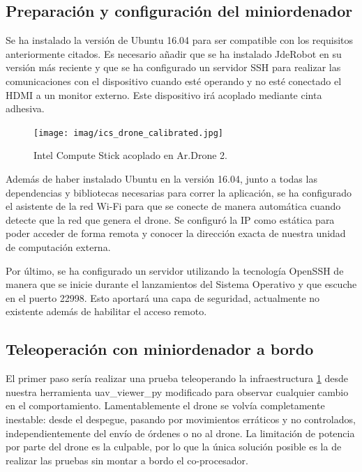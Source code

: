 \subsection{Preparación y configuración del miniordenador}

Se ha instalado la versión de Ubuntu 16.04 para ser compatible con los requisitos anteriormente citados. Es necesario añadir que se ha instalado JdeRobot en su versión más reciente y que se ha configurado un servidor SSH para realizar las comunicaciones con el dispositivo cuando esté operando y no esté conectado el HDMI a un monitor externo. Este dispositivo irá acoplado mediante cinta adhesiva.

\begin{figure}[H]
	\begin{center}
		\texttt{[image: imag/ics\_drone\_calibrated.jpg]}
		\caption{Intel Compute Stick acoplado en Ar.Drone 2.}
		\label{fig:intelAcoplado}	
	\end{center}
\end{figure}

Además de haber instalado Ubuntu en la versión 16.04, junto a todas las dependencias y bibliotecas necesarias para correr la aplicación, se ha configurado el asistente de la red Wi-Fi para que se conecte de manera automática cuando detecte que la red que genera el drone. Se configuró la IP como estática para poder acceder de forma remota y conocer la dirección exacta de nuestra unidad de computación externa. 

Por último, se ha configurado un servidor utilizando la tecnología OpenSSH de manera que se inicie durante el lanzamientos del Sistema Operativo y que escuche en el puerto 22998. Esto  aportará una capa de seguridad, actualmente no existente además de habilitar el acceso remoto.

\subsection{Teleoperación con miniordenador a bordo}

El primer paso sería realizar una prueba teleoperando la infraestructura \ref{fig:intelAcoplado} desde nuestra herramienta uav\_viewer\_py modificado para observar cualquier cambio en el comportamiento. Lamentablemente el drone se volvía completamente inestable: desde el despegue, pasando por movimientos erráticos y no controlados, independientemente del envío de órdenes o no al drone. La limitación de potencia por parte del drone es la culpable, por lo que la única solución posible es la de realizar las pruebas sin montar a bordo el co-procesador.

